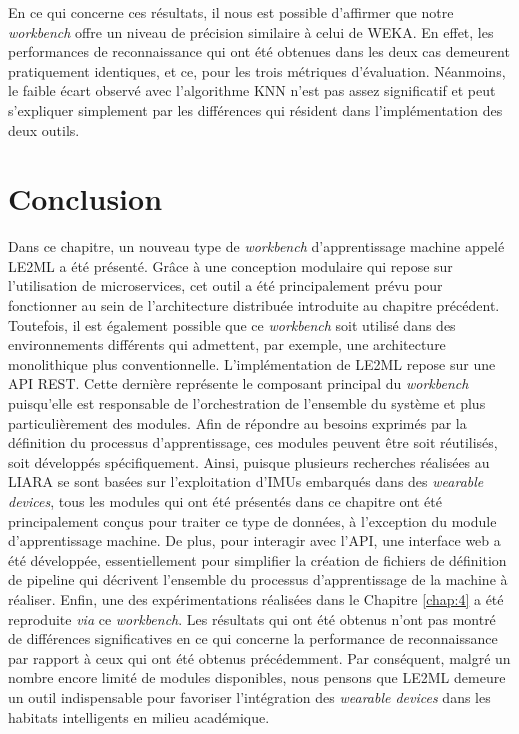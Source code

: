 En ce qui concerne ces résultats, il nous est possible d'affirmer que notre \textit{workbench} offre un niveau de précision similaire à celui de \acs{WEKA}. En effet, les performances de reconnaissance qui ont été obtenues dans les deux cas demeurent pratiquement identiques, et ce, pour les trois métriques d'évaluation. Néanmoins, le faible écart observé avec l'algorithme \acs{KNN} n'est pas assez significatif et peut s'expliquer simplement par les différences qui résident dans l'implémentation des deux outils.

\section{Conclusion}

Dans ce chapitre, un nouveau type de \textit{workbench} d'apprentissage machine appelé \ac{LE2ML} a été présenté. Grâce à une conception modulaire qui repose sur l'utilisation de microservices, cet outil a été principalement prévu pour fonctionner au sein de l'architecture distribuée introduite au chapitre précédent. Toutefois, il est également possible que ce \textit{workbench} soit utilisé dans des environnements différents qui admettent, par exemple, une architecture monolithique plus conventionnelle. L'implémentation de \acs{LE2ML} repose sur une \acs{API} \acs{REST}. Cette dernière représente le composant principal du \textit{workbench} puisqu'elle est responsable de l'orchestration de l'ensemble du système et plus particulièrement des modules. Afin de répondre au besoins exprimés par la définition du processus d'apprentissage, ces modules peuvent être soit réutilisés, soit développés spécifiquement. Ainsi, puisque plusieurs recherches réalisées au \acs{LIARA} se sont basées sur l'exploitation d'\acsp{IMU} embarqués dans des \textit{wearable devices}, tous les modules qui ont été présentés dans ce chapitre ont été principalement conçus pour traiter ce type de données, à l'exception du module d'apprentissage machine. De plus, pour interagir avec l'\acs{API}, une interface web a été développée, essentiellement pour simplifier la création de fichiers de définition de pipeline qui décrivent l'ensemble du processus d'apprentissage de la machine à réaliser. Enfin, une des expérimentations réalisées dans le Chapitre \ref{chap:4} a été reproduite \textit{via} ce \textit{workbench}. Les résultats qui ont été obtenus n'ont pas montré de différences significatives en ce qui concerne la performance de reconnaissance par rapport à ceux qui ont été obtenus précédemment. Par conséquent, malgré un nombre encore limité de modules disponibles, nous pensons que \acs{LE2ML} demeure un outil indispensable pour favoriser l'intégration des \textit{wearable devices} dans les habitats intelligents en milieu académique.

